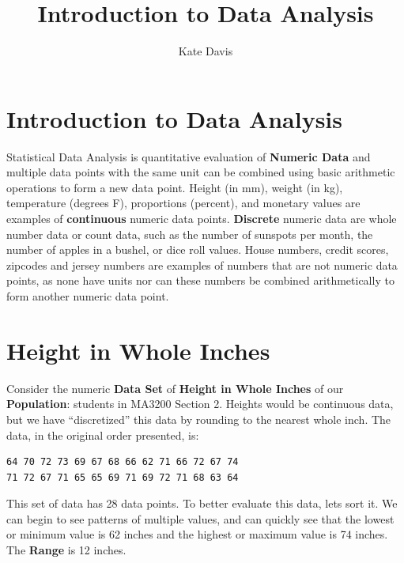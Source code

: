 \documentclass[nohyper,justified]{tufte-handout}\usepackage[]{graphicx}\usepackage[]{color}
\title{Introduction to Data Analysis}
\author{Kate Davis}
\makeatletter
\newenvironment{kframe}{%
 \def\at@end@of@kframe{}%
 \ifinner\ifhmode%
  \def\at@end@of@kframe{\end{minipage}}%
  \begin{minipage}{\columnwidth}%
 \fi\fi%
 \def\FrameCommand##1{\hskip\@totalleftmargin \hskip-\fboxsep
 \colorbox{shadecolor}{##1}\hskip-\fboxsep
     \hskip-\linewidth \hskip-\@totalleftmargin \hskip\columnwidth}%
 \MakeFramed {\advance\hsize-\width
   \@totalleftmargin\z@ \linewidth\hsize
   \@setminipage}}%
 {\par\unskip\endMakeFramed%
 \at@end@of@kframe}
\newenvironment{knitrout}{}{} %
\makeatother
\begin{document}
\maketitle
\section{Introduction to Data Analysis}
Statistical Data Analysis is quantitative evaluation of \textbf{Numeric Data} and multiple data points with the same unit can be combined using basic arithmetic operations to form a new data point. Height (in mm), weight (in kg), temperature (degrees F), proportions (percent), and monetary values are examples of  \textbf{continuous} numeric data points. \textbf{Discrete} numeric data are whole number data or count data, such as the number of sunspots per month, the number of apples in a bushel, or dice roll values.  House numbers, credit scores, zipcodes and jersey numbers are examples of numbers that are not numeric data points, as none have units nor can these numbers be combined arithmetically to form another numeric data point.

\section{Height in Whole Inches}
Consider the numeric \textbf{Data Set} of \textbf{Height in Whole Inches} of our \textbf{Population}: students in MA3200 Section 2. Heights would be continuous data, but we have ``discretized'' this data by rounding to the nearest whole inch. The data, in the original order presented, is:

\begin{knitrout}
\color{fgcolor}\begin{kframe}
\begin{verbatim}
64 70 72 73 69 67 68 66 62 71 66 72 67 74
71 72 67 71 65 65 69 71 69 72 71 68 63 64
\end{verbatim}
\end{kframe}
\end{knitrout}
This set of data has 28 data points. To better evaluate this data, lets sort it. We can begin to see patterns of multiple values, and can quickly see that the lowest or minimum value is 62 inches and the highest or maximum value is 74 inches. The \textbf{Range} is 12 inches.
\end{document}
